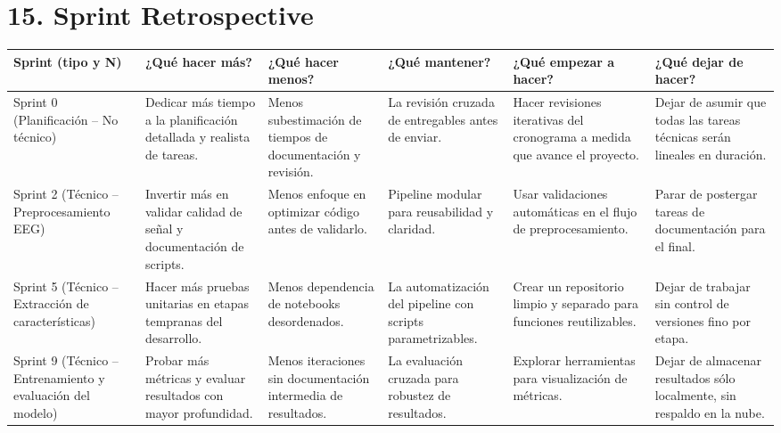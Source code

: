 \documentclass[
11pt, %
]{charter}
\begin{document}
\section{15. Sprint Retrospective}    
\label{sec:sprint_retro}
\begin{table}[H]
\centering
\renewcommand{\arraystretch}{1.5}
\begin{tabularx}{\textwidth}{|>{\centering\arraybackslash}m{2.8cm}|
								  >{\raggedright\arraybackslash}X|
								  >{\raggedright\arraybackslash}X|
								  >{\raggedright\arraybackslash}X|
								  >{\raggedright\arraybackslash}X|
								  >{\raggedright\arraybackslash}X|}
\hline
\rowcolor[HTML]{C0C0C0}
\textbf{Sprint (tipo y N)} & \textbf{¿Qué hacer más?} & \textbf{¿Qué hacer menos?} & \textbf{¿Qué mantener?} & \textbf{¿Qué empezar a hacer?} & \textbf{¿Qué dejar de hacer?} \\
\hline
Sprint 0 (Planificación – No técnico) &
Dedicar más tiempo a la planificación detallada y realista de tareas. &
Menos subestimación de tiempos de documentación y revisión. &
La revisión cruzada de entregables antes de enviar. &
Hacer revisiones iterativas del cronograma a medida que avance el proyecto. &
Dejar de asumir que todas las tareas técnicas serán lineales en duración. \\
\hline
Sprint 2 (Técnico – Preprocesamiento EEG) &
Invertir más en validar calidad de señal y documentación de scripts. &
Menos enfoque en optimizar código antes de validarlo. &
Pipeline modular para reusabilidad y claridad. &
Usar validaciones automáticas en el flujo de preprocesamiento. &
Parar de postergar tareas de documentación para el final. \\
\hline
Sprint 5 (Técnico – Extracción de características) &
Hacer más pruebas unitarias en etapas tempranas del desarrollo. &
Menos dependencia de notebooks desordenados. &
La automatización del pipeline con scripts parametrizables. &
Crear un repositorio limpio y separado para funciones reutilizables. &
Dejar de trabajar sin control de versiones fino por etapa. \\
\hline
Sprint 9 (Técnico – Entrenamiento y evaluación del modelo) &
Probar más métricas y evaluar resultados con mayor profundidad. &
Menos iteraciones sin documentación intermedia de resultados. &
La evaluación cruzada para robustez de resultados. &
Explorar herramientas para visualización de métricas. &
Dejar de almacenar resultados sólo localmente, sin respaldo en la nube. \\
\hline
\end{tabularx}
\end{table}
\end{document}
